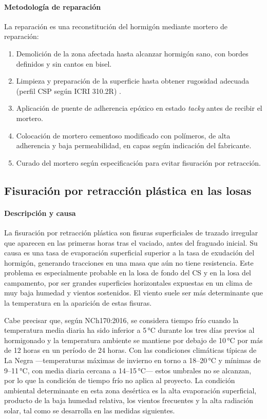 \paragraph{Metodología de reparación}
La reparación es una reconstitución del hormigón mediante mortero de reparación:
\begin{enumerate}
    \item Demolición de la zona afectada hasta alcanzar hormigón sano, con bordes definidos y sin cantos en bisel.
    \item Limpieza y preparación de la superficie hasta obtener rugosidad adecuada (perfil CSP según ICRI 310.2R) \cite{ICRI}.
    \item Aplicación de puente de adherencia epóxico en estado \textit{tacky} antes de recibir el mortero.
    \item Colocación de mortero cementoso modificado con polímeros, de alta adherencia y baja permeabilidad, en capas según indicación del fabricante.
    \item Curado del mortero según especificación para evitar fisuración por retracción.
\end{enumerate}

\subsection{Fisuración por retracción plástica en las losas}

\paragraph{Descripción y causa}
La fisuración por retracción plástica son fisuras superficiales de trazado irregular que aparecen en las primeras horas tras el vaciado, antes del fraguado inicial. Su causa es una tasa de evaporación superficial superior a la tasa de exudación del hormigón, generando tracciones en una masa que aún no tiene resistencia. Este problema es especialmente probable en la losa de fondo del CS y en la losa del campamento, por ser grandes superficies horizontales expuestas en un clima de muy baja humedad y vientos sostenidos. El viento suele ser más determinante que la temperatura en la aparición de estas fisuras.

Cabe precisar que, según NCh170:2016, se considera tiempo frío cuando la temperatura media diaria ha sido inferior a 5\,°C durante los tres días previos al hormigonado y la temperatura ambiente se mantiene por debajo de 10\,°C por más de 12 horas en un período de 24 horas. Con las condiciones climáticas típicas de La Negra —temperaturas máximas de invierno en torno a 18--20\,°C y mínimas de 9--11\,°C, con media diaria cercana a 14--15\,°C— estos umbrales no se alcanzan, por lo que la condición de tiempo frío no aplica al proyecto. La condición ambiental determinante en esta zona desértica es la alta evaporación superficial, producto de la baja humedad relativa, los vientos frecuentes y la alta radiación solar, tal como se desarrolla en las medidas siguientes.

